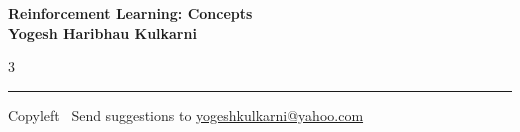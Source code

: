\documentclass[8pt,landscape]{article}
\begin{document}
\footnotesize


\begin{center}
\Large{\textbf{Reinforcement Learning: Concepts\\ Yogesh Haribhau Kulkarni}}
\end{center}

\begin{multicols}{3}

\end{multicols}

\rule{\linewidth}{0.25pt}
\scriptsize
Copyleft \textcopyleft\  Send suggestions to
\href{http://www.yogeshkulkarni.com}{yogeshkulkarni@yahoo.com}
\end{document}
